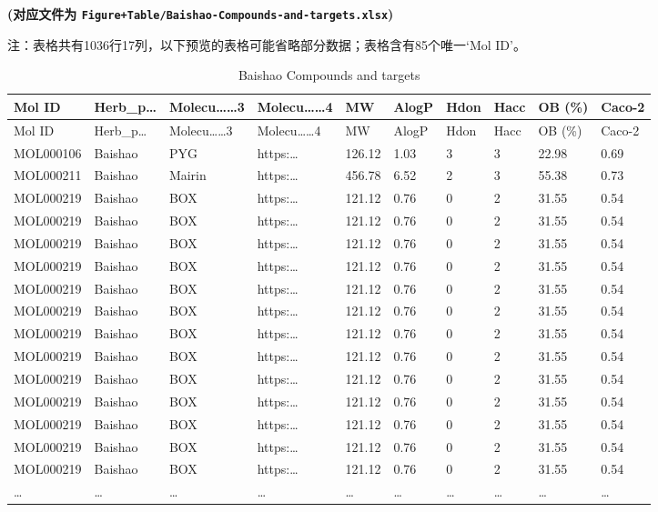 \documentclass[
]{article}
\begin{document}
\textbf{(对应文件为 \texttt{Figure+Table/Baishao-Compounds-and-targets.xlsx})}

\begin{center}\begin{tcolorbox}[colback=gray!10, colframe=gray!50, width=0.9\linewidth, arc=1mm, boxrule=0.5pt]注：表格共有1036行17列，以下预览的表格可能省略部分数据；表格含有85个唯一`Mol ID'。
\end{tcolorbox}
\end{center}

\begin{longtable}[]{@{}llllllllll@{}}
\caption{\label{tab:Baishao-Compounds-and-targets}Baishao Compounds and targets}\tabularnewline
\toprule
Mol ID & Herb\_p\ldots{} & Molecu\ldots\ldots3 & Molecu\ldots\ldots4 & MW & AlogP & Hdon & Hacc & OB (\%) & Caco-2\tabularnewline
\midrule
\endfirsthead
\toprule
Mol ID & Herb\_p\ldots{} & Molecu\ldots\ldots3 & Molecu\ldots\ldots4 & MW & AlogP & Hdon & Hacc & OB (\%) & Caco-2\tabularnewline
\midrule
\endhead
MOL000106 & Baishao & PYG & https:\ldots{} & 126.12 & 1.03 & 3 & 3 & 22.98 & 0.69\tabularnewline
MOL000211 & Baishao & Mairin & https:\ldots{} & 456.78 & 6.52 & 2 & 3 & 55.38 & 0.73\tabularnewline
MOL000219 & Baishao & BOX & https:\ldots{} & 121.12 & 0.76 & 0 & 2 & 31.55 & 0.54\tabularnewline
MOL000219 & Baishao & BOX & https:\ldots{} & 121.12 & 0.76 & 0 & 2 & 31.55 & 0.54\tabularnewline
MOL000219 & Baishao & BOX & https:\ldots{} & 121.12 & 0.76 & 0 & 2 & 31.55 & 0.54\tabularnewline
MOL000219 & Baishao & BOX & https:\ldots{} & 121.12 & 0.76 & 0 & 2 & 31.55 & 0.54\tabularnewline
MOL000219 & Baishao & BOX & https:\ldots{} & 121.12 & 0.76 & 0 & 2 & 31.55 & 0.54\tabularnewline
MOL000219 & Baishao & BOX & https:\ldots{} & 121.12 & 0.76 & 0 & 2 & 31.55 & 0.54\tabularnewline
MOL000219 & Baishao & BOX & https:\ldots{} & 121.12 & 0.76 & 0 & 2 & 31.55 & 0.54\tabularnewline
MOL000219 & Baishao & BOX & https:\ldots{} & 121.12 & 0.76 & 0 & 2 & 31.55 & 0.54\tabularnewline
MOL000219 & Baishao & BOX & https:\ldots{} & 121.12 & 0.76 & 0 & 2 & 31.55 & 0.54\tabularnewline
MOL000219 & Baishao & BOX & https:\ldots{} & 121.12 & 0.76 & 0 & 2 & 31.55 & 0.54\tabularnewline
MOL000219 & Baishao & BOX & https:\ldots{} & 121.12 & 0.76 & 0 & 2 & 31.55 & 0.54\tabularnewline
MOL000219 & Baishao & BOX & https:\ldots{} & 121.12 & 0.76 & 0 & 2 & 31.55 & 0.54\tabularnewline
MOL000219 & Baishao & BOX & https:\ldots{} & 121.12 & 0.76 & 0 & 2 & 31.55 & 0.54\tabularnewline
\ldots{} & \ldots{} & \ldots{} & \ldots{} & \ldots{} & \ldots{} & \ldots{} & \ldots{} & \ldots{} & \ldots{}\tabularnewline
\bottomrule
\end{longtable}
\end{document}
